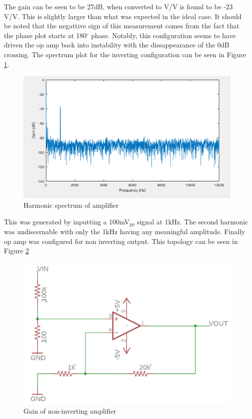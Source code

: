 	
The gain can be seen to be 27dB, when converted to V/V is found to be -23 V/V. This is slightly larger than what was expected in the ideal case. It should be noted that the negattive sign of this measurement comes from the fact that the phase plot starts at 180$^\circ$ phase. Notably, this configuration seems to have driven the op amp back into instability with the dissappearance of the 0dB crossing. The spectrum plot for the inverting configuration can be seen in Figure \ref{fig:spectrum}.

		\begin{figure}[H]
	\begin{center}
		\includegraphics[scale=.40]{ExperimentalImplementation/spectrum.png}
		\caption{Harmonic spectrum of amplifier}
		\label{fig:spectrum}
	\end{center}
\end{figure}

This was generated by inputting a 100mV$_{pp}$ signal at 1kHz. The second harmonic was undiscernable with only the 1kHz having any meaningful amplitude.  Finally op amp was configured for non inverting output. This topology can be seen in Figure \ref{fig:noninvertingschem}
		
						\begin{figure}[H]
			\begin{center}
				\includegraphics[scale=.40]{ExperimentalImplementation/noninvertingschem.png}
				\caption{Gain of non-inverting amplifier}
				\label{fig:noninvertingschem}
			\end{center}
		\end{figure}
	

